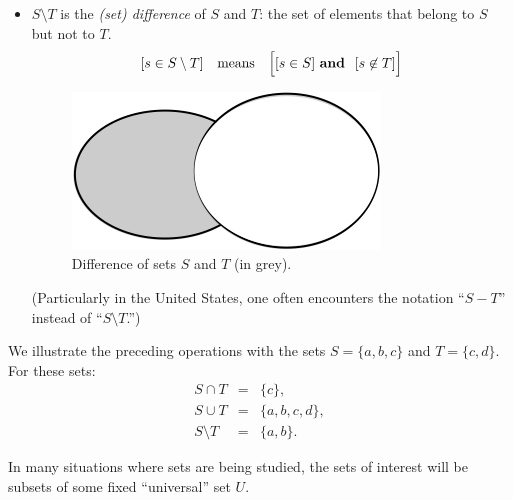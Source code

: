 \begin{itemize}
\begin{figure}[htb]
\end{figure}
\item
$S \setminus T$ is the {\em
  (set) difference} of $S$ and
  $T$: the set of elements that belong to $S$ but not to $T$.
\[ [s \in S \setminus T] \ \ \mbox{ means } \ \
\Big[ [s \in S] \ \mbox{\bf and } \ [s \not\in T] \Big]
\]
\begin{figure}[htb]
\begin{center}
        \includegraphics[scale=0.4]{FiguresMaths/setDiff}
        \caption{Difference of sets $S$ and $T$ (in grey).}
        \label{fig:setDiff}
\end{center}
\end{figure}
(Particularly in the United States, one often encounters the notation
 ``$S-T$''\index{$S - T$: set difference} instead of ``$S \setminus
 T$.'')
\end{itemize}

We illustrate the preceding operations with the sets $S = \{a,b,c\}$
and $T = \{c,d\}$.  For these sets:
\begin{eqnarray*}
S \cap T & = &  \{c\}, \\
S \cup T & = & \{a,b,c,d\}, \\
S \setminus T & = & \{a,b\}.
\end{eqnarray*}

In many situations where sets are being studied, the sets of interest
will be subsets of some fixed ``universal'' set
$U$.

\bigskip

\noindent {}
\bigskip

